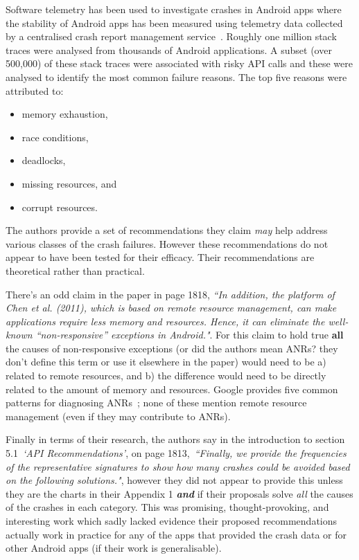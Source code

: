 Software telemetry has been used to investigate crashes in Android apps where the stability of Android apps has been measured using telemetry data collected by a centralised crash report management service~. Roughly one million stack traces were analysed from thousands of Android applications. A subset (over 500,000) of these stack traces were associated with risky API calls and these were analysed to identify the most common failure reasons. The top five reasons were attributed to:
    \begin{itemize}
        \item memory exhaustion,
        \item race conditions,
        \item deadlocks,
        \item missing resources, and
        \item corrupt resources.
    \end{itemize}
    
The authors provide a set of recommendations they claim \emph{may} help address various classes of the crash failures. However these recommendations do not appear to have been tested for their efficacy. Their recommendations are theoretical rather than practical. 

There's an odd claim in the paper in page 1818, \emph{``In addition, the platform of Chen et al. (2011), which is based on remote resource management, can make applications require less memory and resources. Hence, it can eliminate the well-known “non-responsive” exceptions in Android."}. For this claim to hold true \textbf{all} the causes of non-responsive exceptions (or did the authors mean ANRs? they don't define this term or use it elsewhere in the paper) would need to be a) related to remote resources, and b) the difference would need to be directly related to the amount of memory and resources. Google provides five common patterns for diagnosing ANRs~; none of these mention remote resource management (even if they may contribute to ANRs). 

Finally in terms of their research, the authors say in the introduction to section 5.1~\emph{`API Recommendations'}, on page 1813,~\emph{``Finally, we provide the frequencies of the representative signatures to show how many crashes could be avoided based on the following solutions."}, however they did not appear to provide this unless they are the charts in their Appendix 1 \textbf{\emph{and}} if their proposals solve \emph{all} the causes of the crashes in each category. This was promising, thought-provoking, and interesting work which sadly lacked evidence their proposed recommendations actually work in practice for any of the apps that provided the crash data or for other Android apps (if their work is generalisable).


